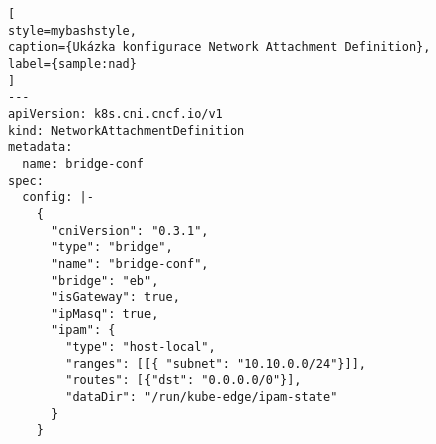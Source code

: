 \begin{lstfloat}
\begin{lstlisting}[
style=mybashstyle,
caption={Ukázka konfigurace Network Attachment Definition},
label={sample:nad}
]
---
apiVersion: k8s.cni.cncf.io/v1
kind: NetworkAttachmentDefinition
metadata:
  name: bridge-conf
spec:
  config: |-
    {
      "cniVersion": "0.3.1",
      "type": "bridge",
      "name": "bridge-conf",
      "bridge": "eb",
      "isGateway": true,
      "ipMasq": true,
      "ipam": {
        "type": "host-local",
        "ranges": [[{ "subnet": "10.10.0.0/24"}]],
        "routes": [{"dst": "0.0.0.0/0"}],
        "dataDir": "/run/kube-edge/ipam-state"
      }
    }
\end{lstlisting}
\end{lstfloat}
